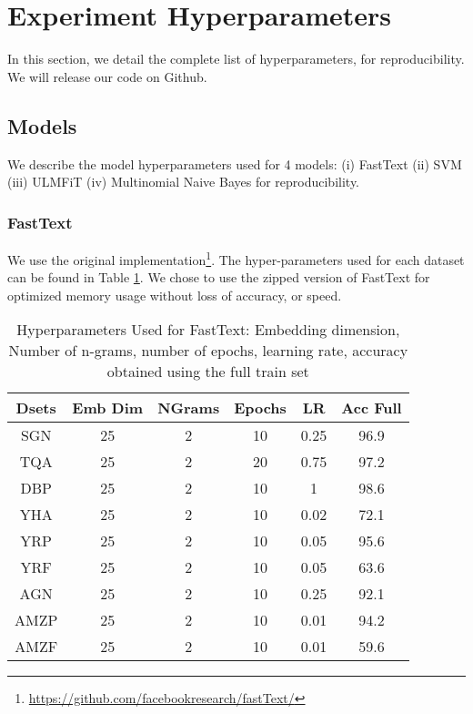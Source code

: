 \documentclass[11pt,a4paper]{article}
\begin{document}
\section{Experiment Hyperparameters}
In this section, we detail the complete list of hyperparameters, for reproducibility. We will release our code on Github.

\subsection{Models}
We describe the model hyperparameters used for 4 models: (i) FastText (ii) SVM (iii) ULMFiT (iv) Multinomial Naive Bayes for reproducibility.
\subsubsection{FastText}
We use the original implementation\footnote{\url{https://github.com/facebookresearch/fastText/}}. The hyper-parameters used for each dataset can be found in Table \ref{tab:fast_hyper}. We chose to use the zipped version of FastText for optimized memory usage without loss of accuracy, or speed.

\begin{table}[t]
\begin{center}
\small\addtolength{\tabcolsep}{-3pt}
\begin{tabular}{|c|c|c|c|c|c|}
\hline
Dsets & Emb Dim & NGrams & Epochs & LR & Acc Full  \\ \hline
SGN &  25 & 2 & 10 & 0.25 & 96.9   \\ \hline
TQA &  25 & 2 & 20 & 0.75 & 97.2 \\ \hline
DBP  &  25 & 2 & 10 & 1 & 98.6 \\ \hline
YHA  &  25 & 2 & 10 & 0.02 & 72.1   \\ \hline
YRP  &  25 & 2 & 10 & 0.05 & 95.6 \\ \hline
YRF & 25 & 2 & 10 & 0.05 & 63.6 \\ \hline
AGN & 25 & 2 & 10 & 0.25 & 92.1 \\ \hline
AMZP &   25 & 2 & 10 & 0.01 & 94.2  \\ \hline
AMZF  & 25 & 2 & 10 & 0.01 & 59.6  \\ \hline
\end{tabular}
\caption{Hyperparameters Used for FastText: Embedding dimension, Number of n-grams, number of epochs, learning rate, accuracy obtained using the full train set}
\label{tab:fast_hyper}
\end{center}
\end{table}
\end{document}
